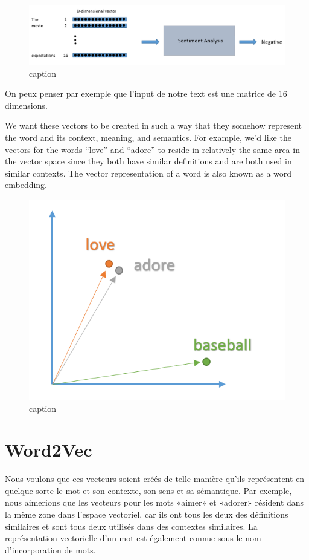 \documentclass[11pt]{article}
\makeatletter
\def\maxwidth{\ifdim\Gin@nat@width>\linewidth\linewidth
    \else\Gin@nat@width\fi}
\let\Oldincludegraphics\includegraphics
\renewcommand{\includegraphics}[1]{\Oldincludegraphics[width=.8\maxwidth]{#1}}
\makeatother
\begin{document}
\begin{figure}
\centering
\includegraphics{Images/SentimentAnalysis2.png}
\caption{caption}
\end{figure}

On peux penser par exemple que l'input de notre text est une matrice de
16 dimensions.

    We want these vectors to be created in such a way that they somehow
represent the word and its context, meaning, and semantics. For example,
we'd like the vectors for the words ``love'' and ``adore'' to reside in
relatively the same area in the vector space since they both have
similar definitions and are both used in similar contexts. The vector
representation of a word is also known as a word embedding.

\begin{figure}
\centering
\includegraphics{Images/SentimentAnalysis8.png}
\caption{caption}
\end{figure}

    \section{Word2Vec}\label{word2vec}

    Nous voulons que ces vecteurs soient créés de telle manière qu'ils
représentent en quelque sorte le mot et son contexte, son sens et sa
sémantique. Par exemple, nous aimerions que les vecteurs pour les mots
«aimer» et «adorer» résident dans la même zone dans l'espace vectoriel,
car ils ont tous les deux des définitions similaires et sont tous deux
utilisés dans des contextes similaires. La représentation vectorielle
d'un mot est également connue sous le nom d'incorporation de mots.
\end{document}
